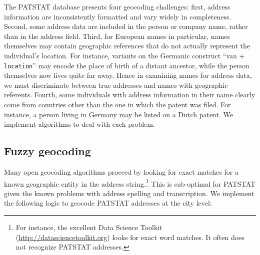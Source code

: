 \documentclass[11pt]{article}
\begin{document}
The PATSTAT database presents four geocoding challenges: first,
address information are inconsistently formatted and vary widely in
completeness. Second, some address data are included in the person or
company name, rather than in the address field. Third, for European
names in particular, names themselves may contain geographic
references that do not actually represent the individual's
location. For instance, variants on the Germanic construct ``van +
\texttt{location}'' may encode the place of birth of a distant
ancestor, while the person themselves now lives quite far away. Hence
in examining names for address data, we must discriminate between true
addresses and names with geographic referents. Fourth, some
individuals with address information in their name clearly come from
countries other than the one in which the patent was filed. For
instance, a person living in Germany may be listed on a Dutch patent. We
implement algorithms to deal with each problem.

\subsection{Fuzzy geocoding}
\label{sec:fuzzy-geocoding}

Many open geocoding algorithms proceed by looking for exact matches
for a known geographic entity in the address string.\footnote{For
instance, the excellent Data Science Toolkit (\url{http://datasciencetoolkit.org}) looks for exact
word matches. It often does not recognize PATSTAT addresses.} This is
sub-optimal for PATSTAT given the known problems with address spelling
and transcription. We implement the following logic to geocode PATSTAT
addresses at the city level:
\end{document}
